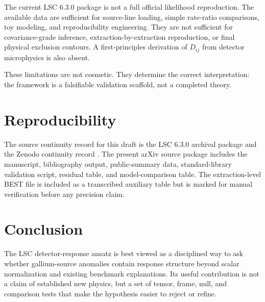 \documentclass[11pt]{article}
\begin{document}
The current LSC 6.3.0 package is not a full official likelihood reproduction.
The available data are sufficient for source-line loading, simple rate-ratio
comparisons, toy modeling, and reproducibility engineering.  They are not
sufficient for covariance-grade inference, extraction-by-extraction
reproduction, or final physical exclusion contours.  A first-principles
derivation of $D_{ij}$ from detector microphysics is also absent.

These limitations are not cosmetic.  They determine the correct interpretation:
the framework is a falsifiable validation scaffold, not a completed theory.

\section{Reproducibility}

The source continuity record for this draft is the LSC 6.3.0 archival package
and the Zenodo continuity record \cite{lsczenodo2026}.  The present arXiv source
package includes the manuscript, bibliography output, public-summary data,
standard-library validation script, residual table, and model-comparison table.
The extraction-level BEST file is included as a transcribed auxiliary table but
is marked for manual verification before any precision claim.

\section{Conclusion}

The LSC detector-response ansatz is best viewed as a disciplined way to ask
whether gallium-source anomalies contain response structure beyond scalar
normalization and existing benchmark explanations.  Its useful contribution is
not a claim of established new physics, but a set of tensor, frame, null, and
comparison tests that make the hypothesis easier to reject or refine.



\end{document}
